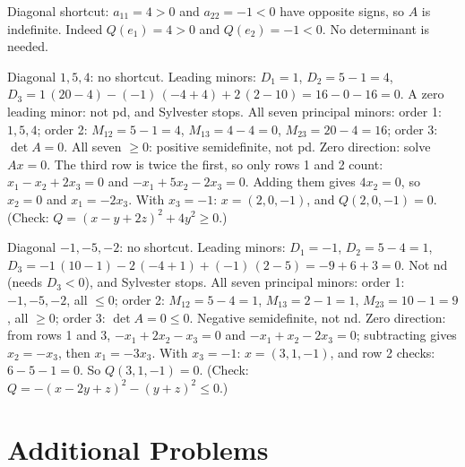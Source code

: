 \begin{solutions}
    \item Diagonal shortcut: $a_{11} = 4 > 0$ and $a_{22} = -1 < 0$ have opposite signs, so $A$ is indefinite. Indeed $Q(e_{1}) = 4 > 0$ and $Q(e_{2}) = -1 < 0$. No determinant is needed.
    \item Diagonal $1, 5, 4$: no shortcut. Leading minors: $D_{1} = 1$, $D_{2} = 5 - 1 = 4$,
          $D_{3} = 1\,(20 - 4) - (-1)\,(-4 + 4) + 2\,(2 - 10) = 16 - 0 - 16 = 0$.
          A zero leading minor: not pd, and Sylvester stops. All seven principal minors: order 1: $1, 5, 4$; order 2: $M_{12} = 5 - 1 = 4$, $M_{13} = 4 - 4 = 0$, $M_{23} = 20 - 4 = 16$; order 3: $\det A = 0$. All seven $\ge 0$: positive semidefinite, not pd.
          Zero direction: solve $A x = 0$. The third row is twice the first, so only rows 1 and 2 count: $x_{1} - x_{2} + 2 x_{3} = 0$ and $-x_{1} + 5 x_{2} - 2 x_{3} = 0$. Adding them gives $4 x_{2} = 0$, so $x_{2} = 0$ and $x_{1} = -2 x_{3}$. With $x_{3} = -1$: $x = (2, 0, -1)$, and $Q(2, 0, -1) = 0$.
          (Check: $Q = (x - y + 2z)^{2} + 4 y^{2} \ge 0$.)
    \item Diagonal $-1, -5, -2$: no shortcut. Leading minors: $D_{1} = -1$, $D_{2} = 5 - 4 = 1$,
          $D_{3} = -1\,(10 - 1) - 2\,(-4 + 1) + (-1)\,(2 - 5) = -9 + 6 + 3 = 0$.
          Not nd (needs $D_{3} < 0$), and Sylvester stops. All seven principal minors: order 1: $-1, -5, -2$, all $\le 0$; order 2: $M_{12} = 5 - 4 = 1$, $M_{13} = 2 - 1 = 1$, $M_{23} = 10 - 1 = 9$, all $\ge 0$; order 3: $\det A = 0 \le 0$. Negative semidefinite, not nd.
          Zero direction: from rows 1 and 3, $-x_{1} + 2 x_{2} - x_{3} = 0$ and $-x_{1} + x_{2} - 2 x_{3} = 0$; subtracting gives $x_{2} = -x_{3}$, then $x_{1} = -3 x_{3}$. With $x_{3} = -1$: $x = (3, 1, -1)$, and row 2 checks: $6 - 5 - 1 = 0$. So $Q(3, 1, -1) = 0$.
          (Check: $Q = -(x - 2y + z)^{2} - (y + z)^{2} \le 0$.)
\end{solutions}

\section{Additional Problems}

